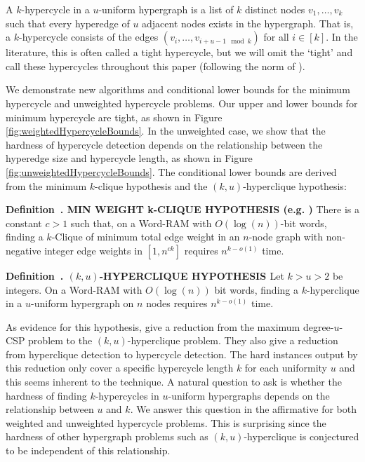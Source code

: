 \documentclass[11pt,letterpaper,pdftex]{article}
\newcounter{definition}
\newenvironment{definition}[1][]{\refstepcounter{definition}\par\medskip
   \noindent \textbf{Definition~\thedefinition. #1} \rmfamily}{\medskip}
\begin{document}
A $k$-hypercycle in a $u$-uniform hypergraph is a list of $k$ distinct nodes $v_1, \ldots, v_k$ such that every hyperedge of $u$ adjacent nodes exists in the hypergraph. 
That is, a $k$-hypercycle consists of the edges $(v_i, \ldots, v_{i+u-1 \mod k})$ for all $i \in [k]$.
In the literature, this is often called a tight hypercycle, but we will omit the `tight' and call these hypercycles throughout this paper (following the norm of \cite{LVW18}). 

We demonstrate new algorithms and conditional lower bounds for the minimum hypercycle and unweighted hypercycle problems.
Our upper and lower bounds for minimum hypercycle are tight, as shown in Figure \ref{fig:weightedHypercycleBounds}.
In the unweighted case, we show that the hardness of hypercycle detection depends on the relationship between the hyperedge size and hypercycle length, as shown in Figure \ref{fig:unweightedHypercycleBounds}.
The conditional lower bounds are derived from the minimum $k$-clique hypothesis and the $(k, u)$-hyperclique hypothesis:


\begin{definition}[MIN WEIGHT k-CLIQUE HYPOTHESIS (e.g. \cite{AbboudWW14,BackursT17})] 
\label{def:minClique}There is a constant $c > 1$ such that, on a Word-RAM with $O(\log(n))$-bit words, finding a $k$-Clique of minimum total edge weight in an $n$-node graph with non-negative integer edge weights in
$[1,n^{ck}]$ requires $n^{k-o(1)}$ time.
\end{definition}

\begin{definition}[$(k, u)$-HYPERCLIQUE HYPOTHESIS \cite{LVW18}]
\label{def:hypercliqueHypothesis}
Let $k > u > 2$ be integers. On a Word-RAM with $O(\log(n))$ bit
words, finding a $k$-hyperclique in a 
$u$-uniform hypergraph on $n$ 
nodes requires $n^{k-o(1)}$ time.
\end{definition}

As evidence for this hypothesis, \cite{LVW18} give a reduction from the maximum degree-$u$-CSP problem to the $(k,u)$-hyperclique problem. 
They also give a reduction from hyperclique detection to hypercycle detection.
The hard instances output by this reduction only cover a specific hypercycle length $k$ for each uniformity $u$ and this seems inherent to the technique.
A natural question to ask is whether the hardness of finding $k$-hypercycles in $u$-uniform hypergraphs depends on the relationship between $u$ and $k$.
We answer this question in the affirmative for both weighted and unweighted hypercycle problems.
This is surprising since the hardness of other hypergraph problems such as $(k,u)$-hyperclique is conjectured to be independent of this relationship.
\end{document}
